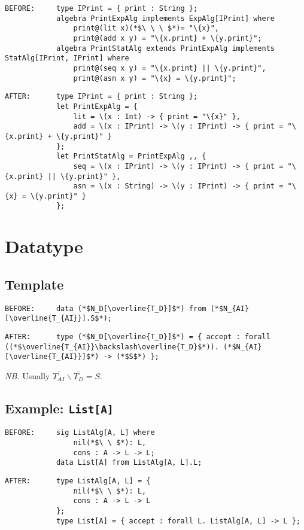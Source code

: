 \documentclass{article}
\newcommand{\nb}{\textit{NB. }}
\begin{document}
\begin{spacing}{1.1}
\begin{lstlisting}[numbers=none]
BEFORE:     type IPrint = { print : String };
            algebra PrintExpAlg implements ExpAlg[IPrint] where
                print@(lit x)(*$\ \ \ $*)= "\{x}",
                print@(add x y) = "\{x.print} + \{y.print}";
            algebra PrintStatAlg extends PrintExpAlg implements StatAlg[IPrint, IPrint] where
                print@(seq x y) = "\{x.print} || \{y.print}",
                print@(asn x y) = "\{x} = \{y.print}";
\end{lstlisting}
\begin{lstlisting}[numbers=none]
AFTER:      type IPrint = { print : String };
            let PrintExpAlg = {
                lit = \(x : Int) -> { print = "\{x}" },
                add = \(x : IPrint) -> \(y : IPrint) -> { print = "\{x.print} + \{y.print}" }
            };
            let PrintStatAlg = PrintExpAlg ,, {
                seq = \(x : IPrint) -> \(y : IPrint) -> { print = "\{x.print} || \{y.print}" },
                asn = \(x : String) -> \(y : IPrint) -> { print = "\{x} = \{y.print}" }
            };
\end{lstlisting}

\section{Datatype}

\subsection{Template}

\begin{lstlisting}[numbers=none]
BEFORE:     data (*$N_D[\overline{T_D}]$*) from (*$N_{AI}[\overline{T_{AI}}].S$*);
\end{lstlisting}
\begin{lstlisting}[numbers=none]
AFTER:      type (*$N_D[\overline{T_D}]$*) = { accept : forall ((*$\overline{T_{AI}}\backslash\overline{T_D}$*)). (*$N_{AI}[\overline{T_{AI}}]$*) -> (*$S$*) };
\end{lstlisting}

\nb Usually $\overline{T_{AI}}\backslash\overline{T_D}=S$.

\subsection{Example: \lstinline{List[A]}}

\begin{lstlisting}[numbers=none]
BEFORE:     sig ListAlg[A, L] where
                nil(*$\ \ $*): L,
                cons : A -> L -> L;
            data List[A] from ListAlg[A, L].L;
\end{lstlisting}
\begin{lstlisting}[numbers=none]
AFTER:      type ListAlg[A, L] = {
                nil(*$\ \ $*): L,
                cons : A -> L -> L
            };
            type List[A] = { accept : forall L. ListAlg[A, L] -> L };
\end{lstlisting}


\end{spacing}
\end{document}
